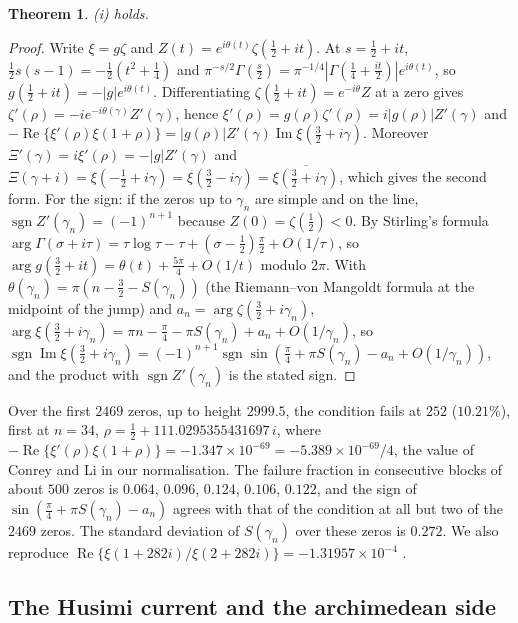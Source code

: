 \documentclass[11pt]{article}
\newtheorem{theorem}{Theorem}[section]
\theoremstyle{definition}\newtheorem{definition}[theorem]{Definition}
\theoremstyle{remark}\newtheorem{remark}[theorem]{Remark}
\renewcommand{\Re}{\operatorname{Re}}\renewcommand{\Im}{\operatorname{Im}}
\begin{document}
\begin{theorem}\label{thm:debranges}
(i) holds.
\end{theorem}
\begin{proof}
Write $\xi=g\zeta$ and $Z(t)=e^{i\theta(t)}\zeta(\frac12+it)$. At $s=\frac12+it$, $\frac12s(s-1)=-\frac12(t^2+\frac14)$ and $\pi^{-s/2}\Gamma(\frac s2)=\pi^{-1/4}|\Gamma(\frac14+\frac{it}2)|e^{i\theta(t)}$, so $g(\frac12+it)=-|g|e^{i\theta(t)}$. Differentiating $\zeta(\frac12+it)=e^{-i\theta}Z$ at a zero gives $\zeta'(\rho)=-ie^{-i\theta(\gamma)}Z'(\gamma)$, hence $\xi'(\rho)=g(\rho)\zeta'(\rho)=i|g(\rho)|Z'(\gamma)$ and $-\Re\{\xi'(\rho)\xi(1+\rho)\}=|g(\rho)|Z'(\gamma)\Im\xi(\frac32+i\gamma)$. Moreover $\Xi'(\gamma)=i\xi'(\rho)=-|g|Z'(\gamma)$ and $\Xi(\gamma+i)=\xi(-\frac12+i\gamma)=\xi(\frac32-i\gamma)=\overline{\xi(\frac32+i\gamma)}$, which gives the second form. For the sign: if the zeros up to $\gamma_n$ are simple and on the line, $\operatorname{sgn}Z'(\gamma_n)=(-1)^{n+1}$ because $Z(0)=\zeta(\frac12)<0$. By Stirling's formula $\arg\Gamma(\sigma+i\tau)=\tau\log\tau-\tau+(\sigma-\frac12)\frac\pi2+O(1/\tau)$, so $\arg g(\frac32+it)=\theta(t)+\frac{5\pi}4+O(1/t)$ modulo $2\pi$. With $\theta(\gamma_n)=\pi(n-\frac32-S(\gamma_n))$ (the Riemann--von Mangoldt formula at the midpoint of the jump) and $a_n=\arg\zeta(\frac32+i\gamma_n)$, $\arg\xi(\frac32+i\gamma_n)=\pi n-\frac\pi4-\pi S(\gamma_n)+a_n+O(1/\gamma_n)$, so $\operatorname{sgn}\Im\xi(\frac32+i\gamma_n)=(-1)^{n+1}\operatorname{sgn}\sin(\frac\pi4+\pi S(\gamma_n)-a_n+O(1/\gamma_n))$, and the product with $\operatorname{sgn}Z'(\gamma_n)$ is the stated sign.
\end{proof}

Over the first $2469$ zeros, up to height $2999.5$, the condition fails at $252$ ($10.21\%$), first at $n=34$, $\rho=\frac12+111.0295355431697\,i$, where $-\Re\{\xi'(\rho)\xi(1+\rho)\}=-1.347\times10^{-69}=-5.389\times10^{-69}/4$, the value of Conrey and Li in our normalisation. The failure fraction in consecutive blocks of about $500$ zeros is $0.064$, $0.096$, $0.124$, $0.106$, $0.122$, and the sign of $\sin(\frac\pi4+\pi S(\gamma_n)-a_n)$ agrees with that of the condition at all but two of the $2469$ zeros. The standard deviation of $S(\gamma_n)$ over these zeros is $0.272$. We also reproduce $\Re\{\xi(1+282i)/\xi(2+282i)\}=-1.31957\times10^{-4}$ \cite{CL}.

\subsection{The Husimi current and the archimedean side}
\end{document}
